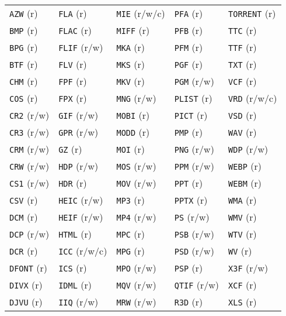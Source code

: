 \documentclass[11pt]{article}
\begin{document}
\begin{table}[htbp]
\begin{tabular}{|l|l|l|l|l|}
\texttt{AZW}   (r) & \texttt{FLA}   (r) & \texttt{MIE}   (r/w/c) & \texttt{PFA}   (r) & \texttt{TORRENT} (r)\\
\texttt{BMP}   (r) & \texttt{FLAC}  (r) & \texttt{MIFF}  (r) & \texttt{PFB}   (r) & \texttt{TTC}   (r)\\
\texttt{BPG}   (r) & \texttt{FLIF}  (r/w) & \texttt{MKA}   (r) & \texttt{PFM}   (r) & \texttt{TTF}   (r)\\
\texttt{BTF}   (r) & \texttt{FLV}   (r) & \texttt{MKS}   (r) & \texttt{PGF}   (r) & \texttt{TXT}   (r)\\
\texttt{CHM}   (r) & \texttt{FPF}   (r) & \texttt{MKV}   (r) & \texttt{PGM}   (r/w) & \texttt{VCF}   (r)\\
\texttt{COS}   (r) & \texttt{FPX}   (r) & \texttt{MNG}   (r/w) & \texttt{PLIST} (r) & \texttt{VRD}   (r/w/c)\\
\texttt{CR2}   (r/w) & \texttt{GIF}   (r/w) & \texttt{MOBI}  (r) & \texttt{PICT}  (r) & \texttt{VSD}   (r)\\
\texttt{CR3}   (r/w) & \texttt{GPR}   (r/w) & \texttt{MODD}  (r) & \texttt{PMP}   (r) & \texttt{WAV}   (r)\\
\texttt{CRM}   (r/w) & \texttt{GZ}    (r) & \texttt{MOI}   (r) & \texttt{PNG}   (r/w) & \texttt{WDP}   (r/w)\\
\texttt{CRW}   (r/w) & \texttt{HDP}   (r/w) & \texttt{MOS}   (r/w) & \texttt{PPM}   (r/w) & \texttt{WEBP}  (r)\\
\texttt{CS1}   (r/w) & \texttt{HDR}   (r) & \texttt{MOV}   (r/w) & \texttt{PPT}   (r) & \texttt{WEBM}  (r)\\
\texttt{CSV}   (r) & \texttt{HEIC}  (r/w) & \texttt{MP3}   (r)\footnotemark & \texttt{PPTX}  (r) & \texttt{WMA}   (r)\\
\texttt{DCM}   (r) & \texttt{HEIF}  (r/w) & \texttt{MP4}   (r/w) & \texttt{PS}    (r/w) & \texttt{WMV}   (r)\\
\texttt{DCP}   (r/w) & \texttt{HTML}  (r) & \texttt{MPC}   (r) & \texttt{PSB}   (r/w) & \texttt{WTV}   (r)\\
\texttt{DCR}   (r) & \texttt{ICC}   (r/w/c) & \texttt{MPG}   (r) & \texttt{PSD}   (r/w) & \texttt{WV}    (r)\\
\texttt{DFONT} (r) & \texttt{ICS}   (r) & \texttt{MPO}   (r/w) & \texttt{PSP}   (r) & \texttt{X3F}   (r/w)\\
\texttt{DIVX}  (r) & \texttt{IDML}  (r) & \texttt{MQV}   (r/w) & \texttt{QTIF}  (r/w) & \texttt{XCF}   (r)\\
\texttt{DJVU}  (r) & \texttt{IIQ}   (r/w) & \texttt{MRW}   (r/w) & \texttt{R3D}   (r) & \texttt{XLS}   (r)\\

\end{tabular}
\end{table}
\end{document}
